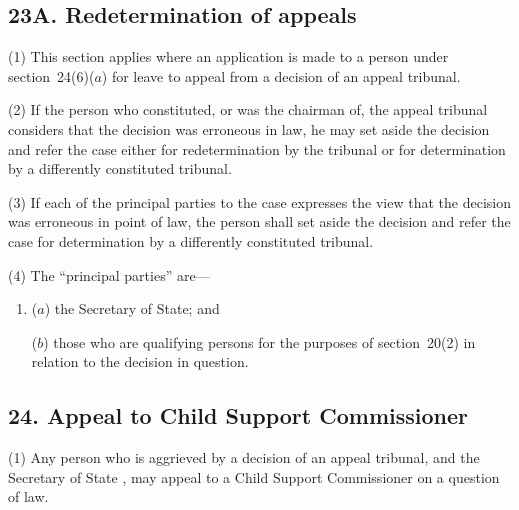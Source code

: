\documentclass[12pt,a4paper]{article}
\begin{document}

\subsection{23A. Redetermination of appeals}

(1) This section applies where an application is made to a person under section~24(6)($a$)  for leave to appeal from a decision of an appeal tribunal.

(2) If the person who constituted, or was the chairman of, the appeal tribunal considers that the decision was erroneous in law, he may set aside the decision and refer the case either for redetermination by the tribunal or for determination by a differently constituted tribunal.

(3) If each of the principal parties to the case expresses the view that the decision was erroneous in point of law, the person shall set aside the decision and refer the case for determination by a differently constituted tribunal.

(4) The “principal parties” are—
\begin{enumerate}\item[]
($a$) the Secretary of State; and

($b$) those who are qualifying persons for the purposes of section~20(2)  in relation to the decision in question.
\end{enumerate}


\subsection{24. Appeal to Child Support Commissioner}

(1) Any person who is aggrieved by a decision of 
an appeal tribunal, and the Secretary of State%
, may appeal to a Child Support Commissioner on a question of law.

\end{document}
